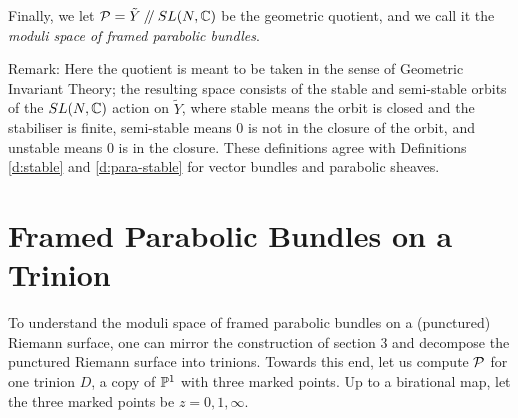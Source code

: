 	Finally, we let $\mathcal{P} = \tilde{Y}\mathbin{/\mkern-4mu/} SL(N,\mathbb{C})$ be the geometric quotient, and we call it the \emph{moduli space of framed parabolic bundles}.
	
	Remark: Here the quotient is meant to be taken in the sense of Geometric Invariant Theory; the resulting space consists of the stable and semi-stable orbits of the $SL(N,\mathbb{C})$ action on $\tilde{Y}$, where stable means the orbit is closed and the stabiliser is finite, semi-stable means $0$ is not in the closure of the orbit, and unstable means $0$ is in the closure. These definitions agree with Definitions \ref{d:stable} and \ref{d:para-stable} for vector bundles and parabolic sheaves.
	
	
	\section{Framed Parabolic Bundles on a Trinion}
	To understand the moduli space of framed parabolic bundles on a (punctured) Riemann surface, one can mirror the construction of section 3 and decompose the punctured Riemann surface into trinions. Towards this end, let us compute $\mathcal{P}$ for one trinion $D$, a copy of $\mathbb{P}^1$ with three marked points. Up to a birational map, let the three marked points be $z=0,1,\infty$. 
	
